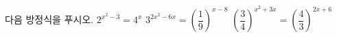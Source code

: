 다음 방정식을 푸시오.
 $2^{x^2-3}=4^x$
 $3^{2x^2-6x}=\left(\dfrac{1}{9}\right)^{x-8}$
 $\left(\dfrac{3}{4}\right)^{x^2+3x}=\left(\dfrac{4}{3}\right)^{2x+6}$
